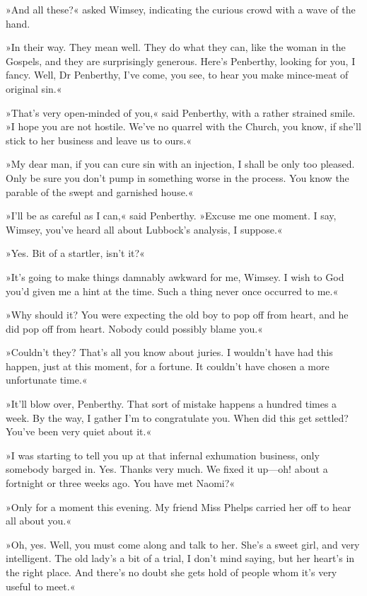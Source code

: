 »And all these?« asked Wimsey, indicating the curious crowd with a wave of the hand.

»In their way. They mean well. They do what they can, like the woman in the Gospels, and they are surprisingly generous. Here's Penberthy, looking for you, I fancy. Well, Dr Penberthy, I've come, you see, to hear you make mince-meat of original sin.«

»That's very open-minded of you,« said Penberthy, with a rather strained smile. »I hope you are not hostile. We've no quarrel with the Church, you know, if she'll stick to her business and leave us to ours.«

»My dear man, if you can cure sin with an injection, I shall be only too pleased. Only be sure you don't pump in something worse in the process. You know the parable of the swept and garnished house.«

»I'll be as careful as I can,« said Penberthy. »Excuse me one moment. I say, Wimsey, you've heard all about Lubbock's analysis, I suppose.«

»Yes. Bit of a startler, isn't it?«

»It's going to make things damnably awkward for me, Wimsey. I wish to God you'd given me a hint at the time. Such a thing never once occurred to me.«

»Why should it? You were expecting the old boy to pop off from heart, and he did pop off from heart. Nobody could possibly blame you.«

»Couldn't they? That's all you know about juries. I wouldn't have had this happen, just at this moment, for a fortune. It couldn't have chosen a more unfortunate time.«

»It'll blow over, Penberthy. That sort of mistake happens a hundred times a week. By the way, I gather I'm to congratulate you. When did this get settled? You've been very quiet about it.«

»I was starting to tell you up at that infernal exhumation business, only somebody barged in. Yes. Thanks very much. We fixed it up\allowbreak---\allowbreak oh! about a fortnight or three weeks ago. You have met Naomi?«

»Only for a moment this evening. My friend Miss Phelps carried her off to hear all about you.«

»Oh, yes. Well, you must come along and talk to her. She's a sweet girl, and very intelligent. The old lady's a bit of a trial, I don't mind saying, but her heart's in the right place. And there's no doubt she gets hold of people whom it's very useful to meet.«


